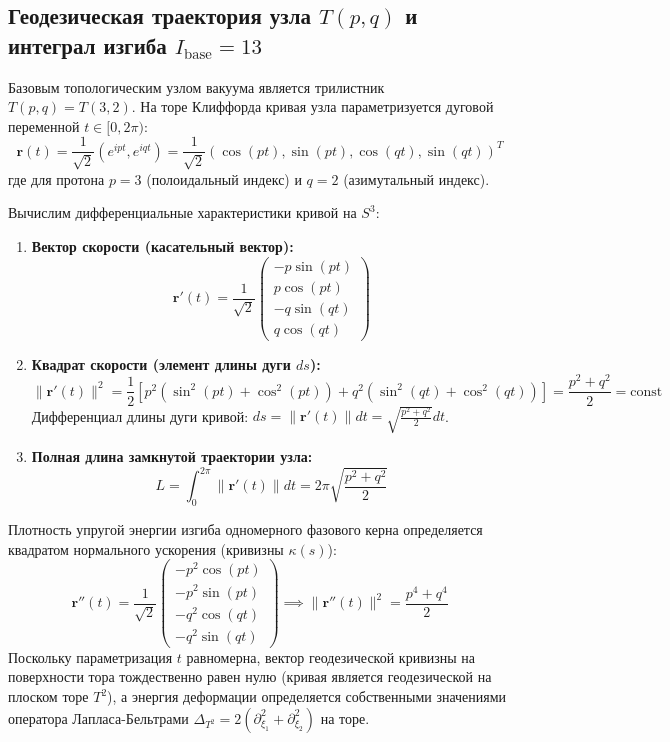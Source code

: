 \documentclass[12pt,a4paper]{article}
\begin{document}
\subsection{Геодезическая траектория узла $T(p,q)$ и интеграл изгиба $I_{\text{base}} = 13$}
Базовым топологическим узлом вакуума является трилистник $T(p,q) = T(3,2)$. На торе Клиффорда кривая узла параметризуется дуговой переменной $t \in [0, 2\pi)$:
\begin{equation}
	\mathbf{r}(t) = \frac{1}{\sqrt{2}} \left( e^{i p t}, e^{i q t} \right) = \frac{1}{\sqrt{2}} \left( \cos(pt), \sin(pt), \cos(qt), \sin(qt) \right)^T
\end{equation}
где для протона $p=3$ (полоидальный индекс) и $q=2$ (азимутальный индекс).

Вычислим дифференциальные характеристики кривой на $S^3$:
\begin{enumerate}
	\item \textbf{Вектор скорости (касательный вектор):}
	\begin{equation}
		\mathbf{r}'(t) = \frac{1}{\sqrt{2}} \begin{pmatrix} -p\sin(pt) \\ p\cos(pt) \\ -q\sin(qt) \\ q\cos(qt) \end{pmatrix}
	\end{equation}
	\item \textbf{Квадрат скорости (элемент длины дуги $ds$):}
	\begin{equation}
		\|\mathbf{r}'(t)\|^2 = \frac{1}{2} \left[ p^2 (\sin^2(pt) + \cos^2(pt)) + q^2 (\sin^2(qt) + \cos^2(qt)) \right] = \frac{p^2 + q^2}{2} = \text{const}
	\end{equation}
	Дифференциал длины дуги кривой: $ds = \|\mathbf{r}'(t)\| dt = \sqrt{\frac{p^2 + q^2}{2}} dt$.
	\item \textbf{Полная длина замкнутой траектории узла:}
	\begin{equation}
		L = \int_0^{2\pi} \|\mathbf{r}'(t)\| dt = 2\pi \sqrt{\frac{p^2 + q^2}{2}}
	\end{equation}
\end{enumerate}

Плотность упругой энергии изгиба одномерного фазового керна определяется квадратом нормального ускорения (кривизны $\kappa(s)$):
\begin{equation}
	\mathbf{r}''(t) = \frac{1}{\sqrt{2}} \begin{pmatrix} -p^2\cos(pt) \\ -p^2\sin(pt) \\ -q^2\cos(qt) \\ -q^2\sin(qt) \end{pmatrix} \implies \|\mathbf{r}''(t)\|^2 = \frac{p^4 + q^4}{2}
\end{equation}
Поскольку параметризация $t$ равномерна, вектор геодезической кривизны на поверхности тора тождественно равен нулю (кривая является геодезической на плоском торе $T^2$), а энергия деформации определяется собственными значениями оператора Лапласа-Бельтрами $\Delta_{T^2} = 2 (\partial_{\xi_1}^2 + \partial_{\xi_2}^2)$ на торе.
\end{document}
